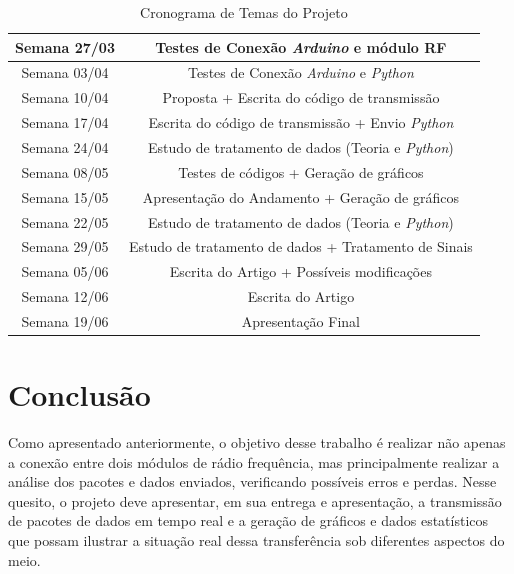 \documentclass[conference]{IEEEtran}
\begin{document}
\renewcommand\tablename{TABELA}
\begin{table}[!t]
\renewcommand{\arraystretch}{1.3}
\caption{Cronograma de Temas do Projeto}
\label{table:cronogramaProjeto}
\centering
\begin{tabular}{|c|c|}
\hline
Semana 27/03 & Testes de Conex\~ao \textit{Arduino} e m\'odulo RF\\
\hline
Semana 03/04 & Testes de Conex\~ao \textit{Arduino} e \textit{Python}\\
\hline
Semana 10/04 & Proposta + Escrita do c\'odigo de transmiss\~ao\\
\hline
Semana 17/04 & Escrita do c\'odigo de transmiss\~ao + Envio \textit{Python}\\
\hline
Semana 24/04 & Estudo de tratamento de dados (Teoria e \textit{Python})\\
\hline
Semana 08/05 & Testes de c\'odigos + Gera\c{c}\~ao de gr\'aficos\\
\hline
Semana 15/05 & Apresenta\c{c}\~ao do Andamento + Gera\c{c}\~ao de gr\'aficos\\
\hline
Semana 22/05 & Estudo de tratamento de dados (Teoria e \textit{Python})\\
\hline
Semana 29/05 & Estudo de tratamento de dados + Tratamento de Sinais\\
\hline
Semana 05/06 & Escrita do Artigo + Poss\'iveis modifica\c{c}\~oes\\
\hline
Semana 12/06 & Escrita do Artigo\\
\hline
Semana 19/06 & Apresenta\c{c}\~ao Final\\
\hline
\end{tabular}
\end{table}

\section{Conclus\~ao}
Como apresentado anteriormente, o objetivo desse trabalho \'e realizar n\~ao apenas a conex\~ao entre dois m\'odulos de r\'adio frequ\^encia, mas principalmente realizar a an\'alise dos pacotes e dados enviados, verificando poss\'iveis erros e perdas. Nesse quesito, o projeto deve apresentar, em sua entrega e apresenta\c{c}\~ao, a transmiss\~ao de pacotes de dados em tempo real e a gera\c{c}\~ao de gr\'aficos e dados estat\'isticos que possam ilustrar a situa\c{c}\~ao real dessa transfer\^encia sob diferentes aspectos do meio.
\end{document}
